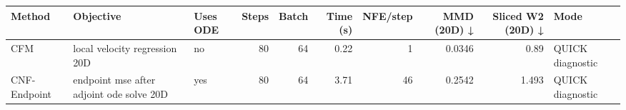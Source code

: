 \begin{tabular}{lllrrrrrrl}
\toprule
Method & Objective & Uses ODE & Steps & Batch & Time (s) & NFE/step & MMD (20D) ↓ & Sliced W2 (20D) ↓ & Mode \\
\midrule
CFM & local velocity regression 20D & no & 80 & 64 & 0.22 & 1 & 0.0346 & 0.89 & QUICK diagnostic \\
CNF-Endpoint & endpoint mse after adjoint ode solve 20D & yes & 80 & 64 & 3.71 & 46 & 0.2542 & 1.493 & QUICK diagnostic \\
\bottomrule
\end{tabular}
